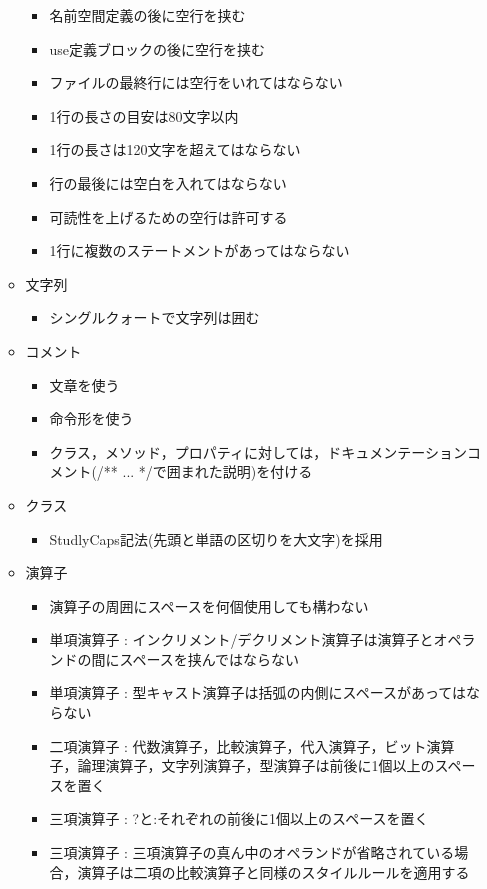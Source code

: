 \documentclass[a4paper, titlepage]{jsarticle}
\begin{document}
\begin{itemize}
\begin{itemize}
    \begin{itemize}
      \item 名前空間定義の後に空行を挟む
      \item use定義ブロックの後に空行を挟む
      \item ファイルの最終行には空行をいれてはならない
      \item 1行の長さの目安は80文字以内
      \item 1行の長さは120文字を超えてはならない
      \item 行の最後には空白を入れてはならない
      \item 可読性を上げるための空行は許可する
      \item 1行に複数のステートメントがあってはならない
    \end{itemize}
    \item 文字列
    \begin{itemize}
      \item シングルクォートで文字列は囲む
    \end{itemize}
    \item コメント
    \begin{itemize}
      \item 文章を使う
      \item 命令形を使う
      \item クラス，メソッド，プロパティに対しては，ドキュメンテーションコメント(/** ... */で囲まれた説明)を付ける
    \end{itemize}
    \item クラス
    \begin{itemize}
      \item StudlyCaps記法(先頭と単語の区切りを大文字)を採用
    \end{itemize}
    \item 演算子
    \begin{itemize}
      \item 演算子の周囲にスペースを何個使用しても構わない
      \item 単項演算子 : インクリメント/デクリメント演算子は演算子とオペランドの間にスペースを挟んではならない
      \item 単項演算子 : 型キャスト演算子は括弧の内側にスペースがあってはならない
      \item 二項演算子 : 代数演算子，比較演算子，代入演算子，ビット演算子，論理演算子，文字列演算子，型演算子は前後に1個以上のスペースを置く
      \item 三項演算子 : ?と:それぞれの前後に1個以上のスペースを置く
      \item 三項演算子 : 三項演算子の真ん中のオペランドが省略されている場合，演算子は二項の比較演算子と同様のスタイルルールを適用する
    \end{itemize}
  \end{itemize}
\end{itemize}
\clearpage
\end{document}
